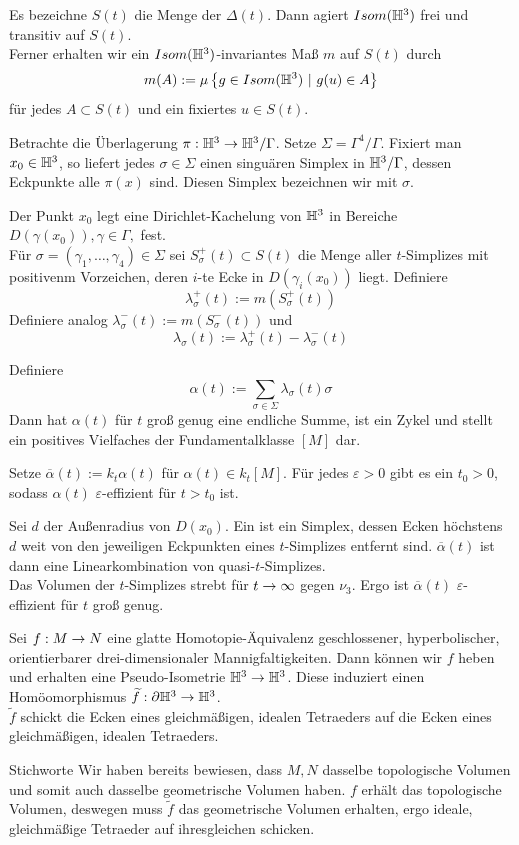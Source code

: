 \documentclass{book}
\renewcommand{\epsilon}{\varepsilon}
\begin{document}
\Bem{}
Es bezeichne $S(t)$ die Menge der $\Delta(t)$. Dann agiert $Isom(\mathbb{H}^3)$ frei und transitiv auf $S(t)$.\\
Ferner erhalten wir ein $Isom(\mathbb{H}^3)$-invariantes Maß $m$ auf $S(t)$ durch
\[ m(A) := \mu \set{ g \in Isom(\H^3) }{ g(u) \in A } \]
für jedes $A \subset S(t)$ und ein fixiertes $u \in S(t)$.

\Def{}
Betrachte die Überlagerung $\pi : \mathbb{H}^3 \overset{}{\rightarrow} \mathbb{H}^3 / \Gamma$. Setze $\Sigma = \Gamma^4 / \Gamma$. Fixiert man $x_0 \in \mathbb{H}^3$, so liefert jedes $\sigma \in \Sigma$ einen singuären Simplex in $\mathbb{H}^3 / \Gamma$, dessen Eckpunkte alle $\pi(x)$ sind. Diesen Simplex bezeichnen wir mit $\sigma$.

\Def{}
Der Punkt $x_0$ legt eine Dirichlet-Kachelung von $\mathbb{H}^3$ in Bereiche $D(\gamma(x_0)), \gamma \in \Gamma,$ fest.\\
Für $\sigma = (\gamma_1,\ldots, \gamma_4)\in \Sigma$ sei $S^+_\sigma(t) \subset S(t)$ die Menge aller $t$-Simplizes mit positivenm Vorzeichen, deren $i$-te Ecke in $D(\gamma_i(x_0))$ liegt. Definiere
\[ \lambda^+_\sigma(t) := m(S^+_\sigma(t)) \]
Definiere analog $\lambda^-_\sigma(t) :=  m(S^-_\sigma(t)) $ und
\[ \lambda_\sigma(t) := \lambda_\sigma^+(t) - \lambda_\sigma^-(t) \]

\Lem{}
Definiere
\[ \alpha(t) := \sum_{\sigma \in \Sigma} \lambda_\sigma(t) \sigma \]
Dann hat $\alpha(t)$ für $t$ groß genug eine endliche Summe, ist ein Zykel und stellt ein positives Vielfaches der Fundamentalklasse $[M]$ dar.

\Lem{}
Setze $\overline{\alpha}(t) := k_t \alpha(t)$ für $\alpha(t) \in k_t [M]$. Für jedes $\epsilon> 0$ gibt es ein $t_0 > 0$, sodass $\alpha(t)$ $\epsilon$-effizient für $t> t_0$ ist.
\begin{Beweis}{}
	Sei $d$ der Außenradius von $D(x_0)$. Ein  ist ein Simplex, dessen Ecken höchstens $d$ weit von den jeweiligen Eckpunkten eines $t$-Simplizes entfernt sind. $\overline{\alpha}(t)$ ist dann eine Linearkombination von quasi-$t$-Simplizes.\\
	Das Volumen der $t$-Simplizes strebt für $t \overset{}{\rightarrow} \infty$ gegen $\nu_3$. Ergo ist $\overline{\alpha}(t)$ $\epsilon$-effizient für $t$ groß genug.
\end{Beweis}

\Lem{}
Sei $f : M \overset{}{\rightarrow} N$ eine glatte Homotopie-Äquivalenz geschlossener, hyperbolischer, orientierbarer drei-dimensionaler Mannigfaltigkeiten. Dann können wir $f$ heben und erhalten eine Pseudo-Isometrie $\mathbb{H}^3 \overset{}{\rightarrow} \mathbb{H}^3$. Diese induziert einen Homöomorphismus $\widetilde{f} : \partial \mathbb{H}^3 \overset{}{\rightarrow} \mathbb{H}^3$.\\
$\widetilde{f}$ schickt die Ecken eines gleichmäßigen, idealen Tetraeders auf die Ecken eines gleichmäßigen, idealen Tetraeders.
\begin{Beweis}{Stichworte}
	Wir haben bereits bewiesen, dass $M,N$ dasselbe topologische Volumen und somit auch dasselbe geometrische Volumen haben. $f$ erhält das topologische Volumen, deswegen muss $\widetilde{f}$ das geometrische Volumen erhalten, ergo ideale, gleichmäßige Tetraeder auf ihresgleichen schicken.
\end{Beweis}
\end{document}
